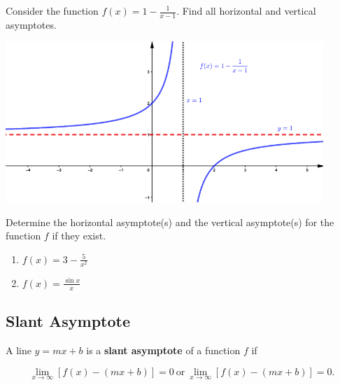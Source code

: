 \begin{example}

Consider the function \(f(x)=1-\frac1{x-1}\). Find all horizontal and
vertical asymptotes.

\includegraphics[width=0.9\textwidth]{img/image-20200415104515572.png}

\end{example}
\vspace*{6\baselineskip}

\begin{example}

Determine the horizontal asymptote(s) and the vertical asymptote(s) for
the function \(f\) if they exist.

\begin{enumerate}
\item
  \(f(x)=3-\frac{5}{x^2}\)
\item
  \(f(x)=\frac{\sin x}{x}\)
\end{enumerate}

\end{example}

\hypertarget{slant-asymptote}{%
\subsection{Slant Asymptote}\label{slant-asymptote}}

\begin{definition}

A line \(y=mx+b\) is a \textbf{slant asymptote} of a function \(f\) if

\[\lim\limits_{x\to \infty}[f(x)-(mx+b)]=0  ~ \text{or} ~ \lim\limits_{x\to \infty}[f(x)-(mx+b)]=0.\]

\end{definition}

